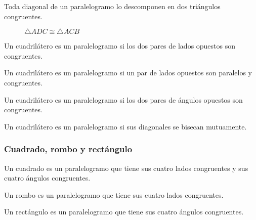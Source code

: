 \clearpage

\begin{theorem}
    Toda diagonal de un paralelogramo lo descomponen en dos triángulos congruentes.
    
    \begin{figure}[!h]
        \centering
        
        \caption{$\triangle{ADC} \cong \triangle{ACB}$}
        \label{fig:theorem13}
    \end{figure}
    
\end{theorem}

\begin{theorem}
    Un cuadrilátero es un paralelogramo si los dos pares de lados opuestos son congruentes.
\end{theorem}

\begin{theorem}
    Un cuadrilátero es un paralelogramo si un par de lados opuestos son paralelos y congruentes.
\end{theorem}

\begin{theorem}
    Un cuadrilátero es un paralelogramo si los dos pares de ángulos opuestos son congruentes.
\end{theorem}

\begin{theorem}
    Un cuadrilátero es un paralelogramo si sus diagonales se bisecan mutuamente.
\end{theorem}

\subsubsection{Cuadrado, rombo y rectángulo}

\begin{definition}
    Un cuadrado es un paralelogramo que tiene sus cuatro lados congruentes y sus cuatro ángulos congruentes.
\end{definition}

\begin{definition}
    Un rombo es un paralelogramo que tiene sus cuatro lados congruentes.
\end{definition}

\begin{definition}
    Un rectángulo es un paralelogramo que tiene sus cuatro ángulos congruentes.
\end{definition}

